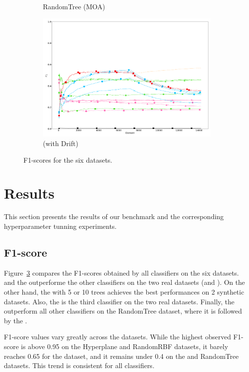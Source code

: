 \begin{figure}
\begin{subfigure}[t]{.49\linewidth}
		\caption{RandomTree (MOA)}
		\label{fig:f1-dataset_3}
	\end{subfigure}
	\hfill
	\begin{subfigure}[t]{.49\linewidth}
		\includegraphics[width=\linewidth]{figures/results/drift_3_f1.png}
		\caption{\banosdataset (with Drift)}
		\label{fig:f1-drift}
	\end{subfigure}
	\caption{F1-scores for the six datasets.}
	\label{fig:f1}
\end{figure}

\section{Results}
This section presents the results of our benchmark and the corresponding
hyperparameter tunning experiments.

\subsection{F1-score}
Figure~\ref{fig:f1} compares the F1-scores obtained by all classifiers on the
six datasets.  \naivebayes and the \hoeffdingtree outperforme the other
classifiers on the two real datasets (\banosdataset and \recofitdataset).  On
the other hand, the \mondrianforest with 5 or 10 trees achieves the best
performances on 2 synthetic datasets.  Also, the \mondrianforest is the third
classifier on the two real datasets.  Finally, the \hoeffdingtree outperform
all other classifiers on the RandomTree dataset, where it is followed by the
\mondrianforest.

F1-score values vary greatly across the datasets.  While the highest
observed F1-score is above 0.95 on the Hyperplane and RandomRBF datasets,
it barely reaches 0.65 for the \banosdataset dataset, and it remains under
0.4 on the \recofitdataset and RandomTree datasets. This trend is
consistent for all classifiers.

